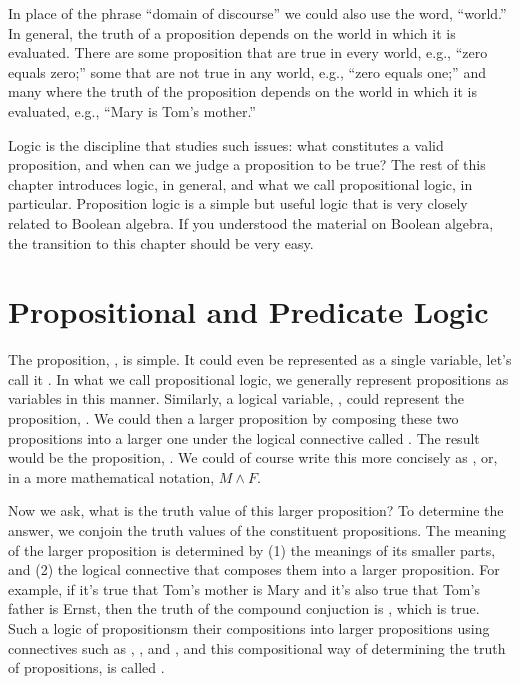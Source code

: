 \documentclass[letterpaper,10pt,english]{sphinxmanual}
\begin{document}
In place of the phrase “domain of discourse” we could also use the
word, “world.” In general, the truth of a proposition depends on the
world in which it is evaluated. There are some proposition that are
true in every world, e.g., “zero equals zero;” some that are not true
in any world, e.g., “zero equals one;” and many where the truth of the
proposition depends on the world in which it is evaluated, e.g., “Mary
is Tom’s mother.”

Logic is the discipline that studies such issues: what constitutes a
valid proposition, and when can we judge a proposition to be true?
The rest of this chapter introduces logic, in general, and what we
call propositional logic, in particular. Proposition logic is a simple
but useful logic that is very closely related to Boolean algebra. If
you understood the material on Boolean algebra, the transition to this
chapter should be very easy.


\section{Propositional and Predicate Logic}
\label{\detokenize{11-propositional-logic:propositional-and-predicate-logic}}
The proposition, , is simple. It could even be
represented as a single variable, let’s call it .  In what we call
propositional logic, we generally represent propositions as variables
in this manner. Similarly, a logical variable, , could represent
the proposition, .  We could then  a
larger proposition by composing these two propositions into a larger
one under the logical connective called . The result would be the
proposition, . We
could of course write this more concisely as , or, in a more
mathematical notation, \(M \land F\).

Now we ask, what is the truth value of this larger proposition? To
determine the answer, we conjoin the truth values of the constituent
propositions.  The meaning of the larger proposition is determined by
(1) the meanings of its smaller parts, and (2) the logical connective
that composes them into a larger proposition. For example, if it’s
true that Tom’s mother is Mary and it’s also true that Tom’s father is
Ernst, then the truth of the compound conjuction is ,
which is true. Such a logic of propositionsm their compositions into
larger propositions using connectives such as , , and ,
and this compositional way of determining the truth of propositions,
is called .
\end{document}
